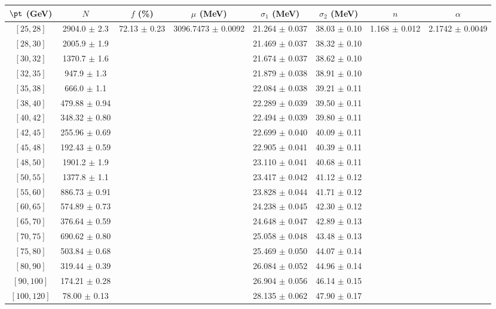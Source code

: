 \begin{tabular}{c||c|c|c|c|c|c|c}
$\pt$ (GeV) & $N$ & $f$ (\%) & $\mu$ (MeV) & $\sigma_1$ (MeV) & $\sigma_2$ (MeV) & $n$ & $\alpha$ \\
\hline
$[25, 28]$ & 2904.0 $\pm$ 2.3 & \multirow{19}{*}{72.13 $\pm$ 0.23} & \multirow{19}{*}{3096.7473 $\pm$ 0.0092} & 21.264 $\pm$ 0.037 & 38.03 $\pm$ 0.10 & \multirow{19}{*}{1.168 $\pm$ 0.012} & \multirow{19}{*}{2.1742 $\pm$ 0.0049}\\
$[28, 30]$ & 2005.9 $\pm$ 1.9 &  &  & 21.469 $\pm$ 0.037 & 38.32 $\pm$ 0.10 &  & \\
$[30, 32]$ & 1370.7 $\pm$ 1.6 &  &  & 21.674 $\pm$ 0.037 & 38.62 $\pm$ 0.10 &  & \\
$[32, 35]$ & 947.9 $\pm$ 1.3 &  &  & 21.879 $\pm$ 0.038 & 38.91 $\pm$ 0.10 &  & \\
$[35, 38]$ & 666.0 $\pm$ 1.1 &  &  & 22.084 $\pm$ 0.038 & 39.21 $\pm$ 0.11 &  & \\
$[38, 40]$ & 479.88 $\pm$ 0.94 &  &  & 22.289 $\pm$ 0.039 & 39.50 $\pm$ 0.11 &  & \\
$[40, 42]$ & 348.32 $\pm$ 0.80 &  &  & 22.494 $\pm$ 0.039 & 39.80 $\pm$ 0.11 &  & \\
$[42, 45]$ & 255.96 $\pm$ 0.69 &  &  & 22.699 $\pm$ 0.040 & 40.09 $\pm$ 0.11 &  & \\
$[45, 48]$ & 192.43 $\pm$ 0.59 &  &  & 22.905 $\pm$ 0.041 & 40.39 $\pm$ 0.11 &  & \\
$[48, 50]$ & 1901.2 $\pm$ 1.9 &  &  & 23.110 $\pm$ 0.041 & 40.68 $\pm$ 0.11 &  & \\
$[50, 55]$ & 1377.8 $\pm$ 1.1 &  &  & 23.417 $\pm$ 0.042 & 41.12 $\pm$ 0.12 &  & \\
$[55, 60]$ & 886.73 $\pm$ 0.91 &  &  & 23.828 $\pm$ 0.044 & 41.71 $\pm$ 0.12 &  & \\
$[60, 65]$ & 574.89 $\pm$ 0.73 &  &  & 24.238 $\pm$ 0.045 & 42.30 $\pm$ 0.12 &  & \\
$[65, 70]$ & 376.64 $\pm$ 0.59 &  &  & 24.648 $\pm$ 0.047 & 42.89 $\pm$ 0.13 &  & \\
$[70, 75]$ & 690.62 $\pm$ 0.80 &  &  & 25.058 $\pm$ 0.048 & 43.48 $\pm$ 0.13 &  & \\
$[75, 80]$ & 503.84 $\pm$ 0.68 &  &  & 25.469 $\pm$ 0.050 & 44.07 $\pm$ 0.14 &  & \\
$[80, 90]$ & 319.44 $\pm$ 0.39 &  &  & 26.084 $\pm$ 0.052 & 44.96 $\pm$ 0.14 &  & \\
$[90, 100]$ & 174.21 $\pm$ 0.28 &  &  & 26.904 $\pm$ 0.056 & 46.14 $\pm$ 0.15 &  & \\
$[100, 120]$ & 78.00 $\pm$ 0.13 &  &  & 28.135 $\pm$ 0.062 & 47.90 $\pm$ 0.17 &  & \\
\end{tabular}
